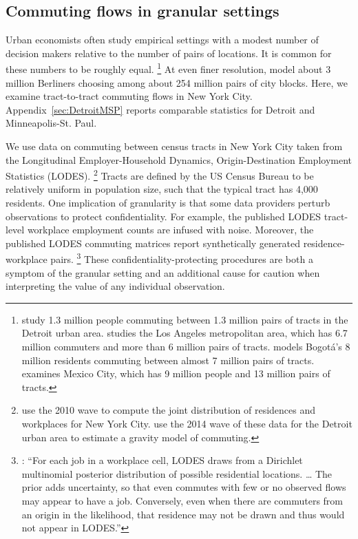 \documentclass[11pt]{article}
\theoremstyle{definition}
\begin{document}
\subsection{Commuting flows in granular settings}\label{sec:ctflgranular:summstats}

Urban economists often study empirical settings with a modest number of decision makers relative to the number of pairs of locations.
It is common for these numbers to be roughly equal.%
\footnote{
\cite{OwensRossi-HansbergSarte:2020} study 1.3 million people commuting between 1.3 million pairs of tracts in the Detroit urban area.
\cite{Severen:2023} studies the Los Angeles metropolitan area,
which has 6.7 million commuters and more than 6 million pairs of tracts.
\cite{Tsivanidis:2023} models Bogot\'{a}'s 8 million residents commuting between almost 7 million pairs of tracts.
\cite{Zarate:2023} examines Mexico City, which has 9 million people and 13 million pairs of tracts.
}
At even finer resolution,
\cite{AhlfeldtReddingSturmWolf:2015} model about 3 million Berliners choosing among about 254 million pairs of city blocks.
Here, we examine tract-to-tract commuting flows in New York City.
Appendix~\ref{sec:DetroitMSP} reports comparable statistics for Detroit and Minneapolis-St. Paul.

We use data on commuting between census tracts in New York City taken from the 
Longitudinal Employer-Household Dynamics, Origin-Destination Employment Statistics (LODES).%
\footnote{
\cite{DavisDingelMonrasMorales:2019} use the 2010 wave to compute the joint distribution of residences and workplaces for New York City.
\cite{OwensRossi-HansbergSarte:2020} use the 2014 wave of these data for the Detroit urban area to estimate a gravity model of commuting.
}
Tracts are defined by the US Census Bureau to be relatively uniform in population size, such that the typical tract has 4,000 residents.
One implication of granularity is that some data providers perturb observations to protect confidentiality.
For example, the published LODES tract-level workplace employment counts are infused with noise.
Moreover, the published LODES commuting matrices report synthetically generated residence-workplace pairs.%
\footnote{\cite{GrahamKutzbachMcKenzie:2014}:
``For each job in a workplace cell, LODES draws from a Dirichlet multinomial posterior distribution of possible residential locations. \dots
The prior adds uncertainty, so that even commutes with few or no observed flows may appear to have a job.
Conversely, even when there are commuters from an origin in the likelihood, that residence may not be drawn and thus would not appear in LODES.''}
These confidentiality-protecting procedures are both a symptom of the granular setting and an additional cause for caution when interpreting the value of any individual observation.
\end{document}
